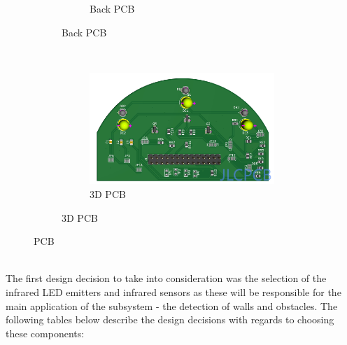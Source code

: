 \documentclass[class=report,11pt,crop=false]{standalone}
\begin{document}
\begin{figure}[h]
\begin{subfigure}[b]{0.3\linewidth}
\begin{figure}
            \caption{Back PCB}
            \label{fig:PCB_back}
        \end{figure}
    \end{subfigure}
    \hfill %
    \\
    \begin{subfigure}[b]{0.3\linewidth}
        \begin{figure}
            \centering
            \includegraphics[width= 2\linewidth]{EEE3088F_final_report_latex_template-2//Figures/3D_Model_2.jpg}
            \caption{3D PCB}
            \label{fig:PCB_3D}
        \end{figure}
    \end{subfigure}
    \caption{PCB}
    \label{fig:PCB}
\end{figure}
\\
The first design decision to take into consideration was the selection of the infrared LED emitters and infrared sensors as these will be responsible for the main application of the subsystem - the detection of walls and obstacles. The following tables below describe the design decisions with regards to choosing these components:
\end{document}
